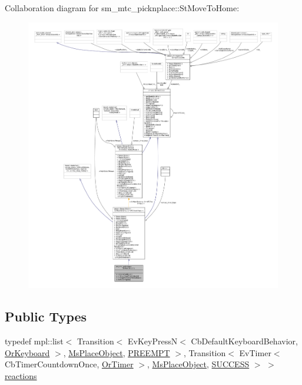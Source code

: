 Collaboration diagram for sm\+\_\+mtc\+\_\+picknplace\+:\+:St\+Move\+To\+Home\+:
\nopagebreak
\begin{figure}[H]
\begin{center}
\leavevmode
\includegraphics[width=350pt]{structsm__mtc__picknplace_1_1StMoveToHome__coll__graph}
\end{center}
\end{figure}
\subsection*{Public Types}
\begin{DoxyCompactItemize}
\item 
typedef mpl\+::list$<$ Transition$<$ Ev\+Key\+PressN$<$ Cb\+Default\+Keyboard\+Behavior, \hyperlink{classsm__mtc__picknplace_1_1OrKeyboard}{Or\+Keyboard} $>$, \hyperlink{classsm__mtc__picknplace_1_1MsPlaceObject}{Ms\+Place\+Object}, \hyperlink{classPREEMPT}{P\+R\+E\+E\+M\+PT} $>$, Transition$<$ Ev\+Timer$<$ Cb\+Timer\+Countdown\+Once, \hyperlink{classsm__mtc__picknplace_1_1OrTimer}{Or\+Timer} $>$, \hyperlink{classsm__mtc__picknplace_1_1MsPlaceObject}{Ms\+Place\+Object}, \hyperlink{classSUCCESS}{S\+U\+C\+C\+E\+SS} $>$ $>$ \hyperlink{structsm__mtc__picknplace_1_1StMoveToHome_a2a0370866aac935b0e2648a67d56cb21}{reactions}
\end{DoxyCompactItemize}
